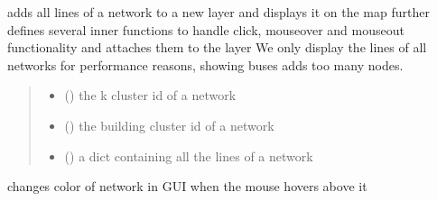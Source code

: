 \documentclass[letterpaper,10pt,english]{sphinxmanual}
\begin{document}
\begin{fulllineitems}
\label{\detokenize{docs_gui/js_api/postcode_editor/display_postcode:displayPreviewNet}}
\pysigstartsignatures
{}
\pysigstopsignatures
\sphinxAtStartPar
adds all lines of a network to a new layer and displays it on the map
further defines several inner functions to handle click, mouseover and mouseout functionality and attaches them to the layer
We only display the lines of all networks for performance reasons, showing buses adds too many nodes.
\begin{quote}\begin{description}
\begin{itemize}
\item {} 
\sphinxAtStartPar
{} () \textendash{} the k cluster id of a network

\item {} 
\sphinxAtStartPar
{} () \textendash{} the building cluster id of a network

\item {} 
\sphinxAtStartPar
{} () \textendash{} a dict containing all the lines of a network

\end{itemize}

\end{description}\end{quote}

\end{fulllineitems}


\begin{fulllineitems}
\label{\detokenize{docs_gui/js_api/postcode_editor/display_postcode:styleWhenMouseOver}}
\pysigstartsignatures
{}
\pysigstopsignatures
\sphinxAtStartPar
changes color of network in GUI when the mouse hovers above it

\end{fulllineitems}
\end{document}

